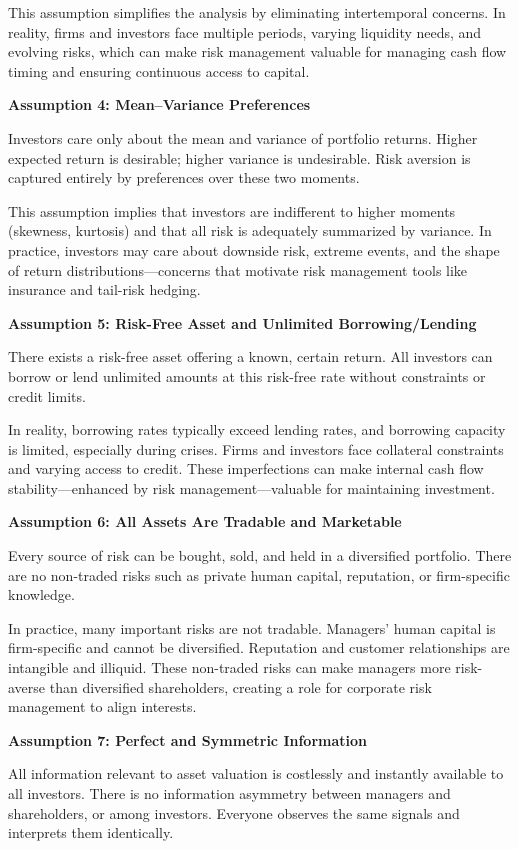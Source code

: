 \documentclass[11pt,openany]{book}
\begin{document}
This assumption simplifies the analysis by eliminating intertemporal concerns. In reality, firms and investors face multiple periods, varying liquidity needs, and evolving risks, which can make risk management valuable for managing cash flow timing and ensuring continuous access to capital.

\textbf{Assumption 4: Mean--Variance Preferences}

Investors care only about the mean and variance of portfolio returns. Higher expected return is desirable; higher variance is undesirable. Risk aversion is captured entirely by preferences over these two moments.

This assumption implies that investors are indifferent to higher moments (skewness, kurtosis) and that all risk is adequately summarized by variance. In practice, investors may care about downside risk, extreme events, and the shape of return distributions---concerns that motivate risk management tools like insurance and tail-risk hedging.

\textbf{Assumption 5: Risk-Free Asset and Unlimited Borrowing/Lending}

There exists a risk-free asset offering a known, certain return. All investors can borrow or lend unlimited amounts at this risk-free rate without constraints or credit limits.

In reality, borrowing rates typically exceed lending rates, and borrowing capacity is limited, especially during crises. Firms and investors face collateral constraints and varying access to credit. These imperfections can make internal cash flow stability---enhanced by risk management---valuable for maintaining investment.

\textbf{Assumption 6: All Assets Are Tradable and Marketable}

Every source of risk can be bought, sold, and held in a diversified portfolio. There are no non-traded risks such as private human capital, reputation, or firm-specific knowledge.

In practice, many important risks are not tradable. Managers' human capital is firm-specific and cannot be diversified. Reputation and customer relationships are intangible and illiquid. These non-traded risks can make managers more risk-averse than diversified shareholders, creating a role for corporate risk management to align interests.

\textbf{Assumption 7: Perfect and Symmetric Information}

All information relevant to asset valuation is costlessly and instantly available to all investors. There is no information asymmetry between managers and shareholders, or among investors. Everyone observes the same signals and interprets them identically.
\end{document}
